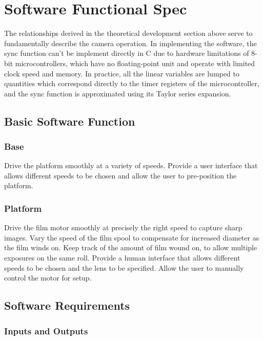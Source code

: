 \documentclass[dvips,12pt]{article}
\begin{document}
\section{Software Functional Spec}

The relationships derived in the theoretical development section above serve to fundamentally describe the camera operation. In implementing the software, the sync function can't be implement directly in C due to hardware limitations of 8-bit microcontrollers, which have no floating-point unit and operate with limited clock speed and memory. In practice, all the linear variables are lumped to quantities which correspond directly to the timer registers of the microcontroller, and the sync function is approximated using its Taylor series expansion. 

\subsection{Basic Software Function}

\subsubsection{Base}
Drive the platform smoothly at a variety of speeds. Provide a user interface that allows different speeds to be chosen and allow the user to pre-position the platform.

\subsubsection{Platform}
Drive the film motor smoothly at precisely the right speed to capture sharp images. Vary the speed of the film spool to compensate for increased diameter as the film winds on. Keep track of the amount of film wound on, to allow multiple exposures on the same roll. Provide a human interface that allows different speeds to be chosen and the lens to be specified. Allow the user to manually control the motor for setup.

\subsection{Software Requirements}
\subsubsection{Inputs and Outputs}
\end{document}
